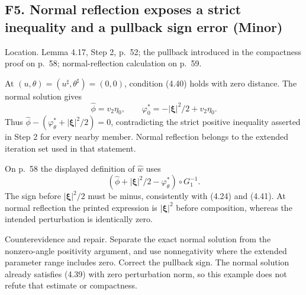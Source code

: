 \documentclass[10pt]{article}
\begin{document}
\subsection*{F5. Normal reflection exposes a strict inequality and a pullback sign error (Minor)}
Location. Lemma 4.17, Step 2, p. 52; the pullback introduced in the compactness proof on p. 58; normal-reflection calculation on p. 59.\par
At \((u,\theta)=(u^\sharp,\theta^\sharp)=(0,0)\), condition (4.40) holds with zero distance. The normal solution gives \[\widehat\phi=v_2\eta_0,\qquad
 \varphi_0^*=-|\boldsymbol\xi|^2/2+v_2\eta_0.\] Thus \(\widehat\phi-(\varphi_\theta^*+|\boldsymbol\xi|^2/2)=0\), contradicting the strict positive inequality asserted in Step 2 for every nearby member. Normal reflection belongs to the extended iteration set used in that statement.\par
On p. 58 the displayed definition of \(\widehat w\) uses \[(\widehat\phi+|\boldsymbol\xi|^2/2-\varphi_\theta^*)\circ G_1^{-1}.\] The sign before \(|\boldsymbol\xi|^2/2\) must be minus, consistently with (4.24) and (4.41). At normal reflection the printed expression is \(|\boldsymbol\xi|^2\) before composition, whereas the intended perturbation is identically zero.\par
Counterevidence and repair. Separate the exact normal solution from the nonzero-angle positivity argument, and use nonnegativity where the extended parameter range includes zero. Correct the pullback sign. The normal solution already satisfies (4.39) with zero perturbation norm, so this example does not refute that estimate or compactness.\par
\end{document}
